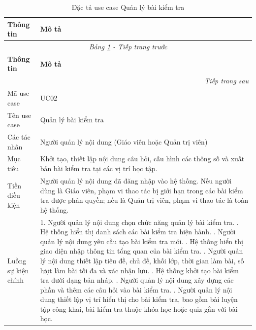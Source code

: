 ﻿\documentclass[../DoAn.tex]{subfiles}
\begin{document}
\begin{longtable}{|p{3.5cm}|p{10.5cm}|}
\caption{Đặc tả use case Quản lý bài kiểm tra}
\label{table:uc02_quan_ly_bai_kiem_tra} \\
\hline
\textbf{Thông tin} & \textbf{Mô tả} \\ \hline
\endfirsthead

\hline
\multicolumn{2}{|c|}{\textit{Bảng \ref{table:uc02_quan_ly_bai_kiem_tra} - Tiếp trang trước}} \\ \hline
\textbf{Thông tin} & \textbf{Mô tả} \\ \hline
\endhead

\hline
\multicolumn{2}{|r|}{\textit{Tiếp trang sau}} \\ \hline
\endfoot

\hline
\endlastfoot

Mã use case & UC02 \\ \hline
Tên use case & Quản lý bài kiểm tra \\ \hline
Các tác nhân & Người quản lý nội dung (Giáo viên hoặc Quản trị viên) \\ \hline
Mục tiêu & Khởi tạo, thiết lập nội dung câu hỏi, cấu hình các thông số và xuất bản bài kiểm tra tại các vị trí học tập. \\ \hline
Tiền điều kiện & Người quản lý nội dung đã đăng nhập vào hệ thống. Nếu người dùng là Giáo viên, phạm vi thao tác bị giới hạn trong các bài kiểm tra được phân quyền; nếu là Quản trị viên, phạm vi thao tác là toàn hệ thống. \\ \hline
Luồng sự kiện chính & 
1. Người quản lý nội dung chọn chức năng quản lý bài kiểm tra. \newline
2. Hệ thống hiển thị danh sách các bài kiểm tra hiện hành. \newline
3. Người quản lý nội dung yêu cầu tạo bài kiểm tra mới. \newline
4. Hệ thống hiển thị giao diện nhập thông tin tổng quan của bài kiểm tra. \newline
5. Người quản lý nội dung thiết lập tiêu đề, chủ đề, khối lớp, thời gian làm bài, số lượt làm bài tối đa và xác nhận lưu. \newline
6. Hệ thống khởi tạo bài kiểm tra dưới dạng bản nháp. \newline
7. Người quản lý nội dung xây dựng các phần và thêm các câu hỏi vào bài kiểm tra. \newline
8. Người quản lý nội dung thiết lập vị trí hiển thị cho bài kiểm tra, bao gồm bài luyện tập công khai, bài kiểm tra thuộc khóa học hoặc quiz gắn với bài học. \newline

\end{longtable}
\end{document}
